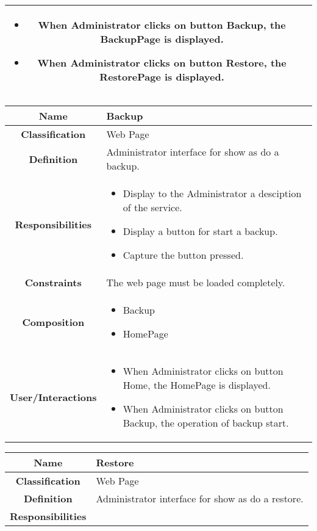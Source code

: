 \documentclass[11pt, a4paper,titlepage]{article}
\begin{document}
\begin{enumerate}
\begin{tabularx}{\textwidth}{| c | X |}
\begin{itemize}
		\item When Administrator clicks on button Backup, the BackupPage is displayed.
		\item When Administrator clicks on button Restore, the RestorePage is displayed.
	\end{itemize}
	\\
	\hline 
\end{tabularx}
\begin{tabularx}{\textwidth}{| c | X |}
	\hline
	\textbf{Name} &
	Backup
	\\
	\hline
	\textbf{Classification} &
	Web Page
	\\
	\hline
	\textbf{Definition} &
	Administrator interface for show as do a backup.\\
	\hline
	\textbf{Responsibilities} &
	\begin{itemize}
		\item Display to the Administrator a desciption of the service.
		\item Display a button for start a backup.
		\item Capture the button pressed.
	\end{itemize}
	\\
	\hline
	\textbf{Constraints} & The web page must be loaded completely.
	\\
	\hline
	\textbf{Composition} &
	\begin{itemize}
		\item Backup
		\item HomePage
	\end{itemize}
	\\
	\hline
	\textbf{User/Interactions} &
	\begin{itemize}
		\item When Administrator clicks on button Home, the HomePage is displayed.
		\item When Administrator clicks on button Backup, the operation of backup start.
	\end{itemize}
	\\
	\hline 
\end{tabularx}
\begin{tabularx}{\textwidth}{| c | X |}
	\hline
	\textbf{Name} &
	Restore
	\\
	\hline
	\textbf{Classification} &
	Web Page
	\\
	\hline
	\textbf{Definition} &
	Administrator interface for show as do a restore.\\
	\hline
	\textbf{Responsibilities} &
	\begin{itemize}

\end{itemize}
\end{tabularx}
\end{enumerate}
\end{document}
